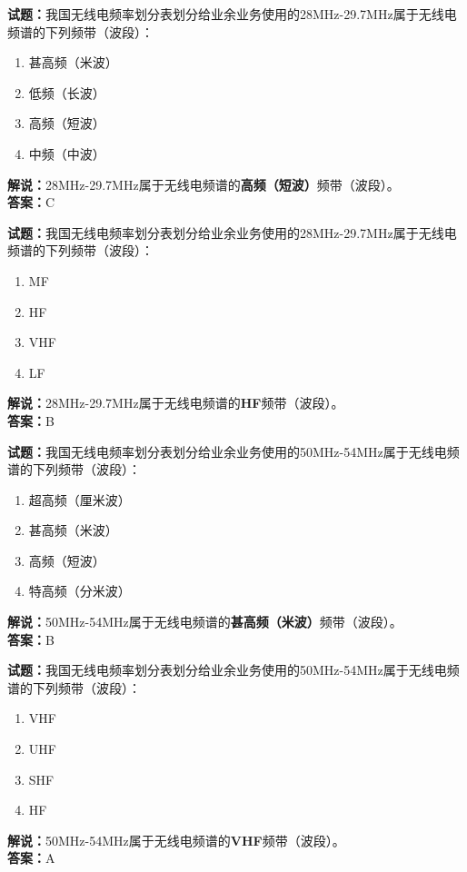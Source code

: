 \documentclass{ctexbook}
\begin{document}
\bigskip


\noindent\textbf{试题：}我国无线电频率划分表划分给业余业务使用的28\unit{\MHz}-29.7\unit{\MHz}属于无线电频谱的下列频带（波段）：
\begin{enumerate}[leftmargin=3em]
\item 甚高频（米波）
\item 低频（长波）
\item 高频（短波）
\item 中频（中波）
\end{enumerate}
\noindent\textbf{解说：}28\unit{\MHz}-29.7\unit{\MHz}属于无线电频谱的\textbf{高频（短波）}频带（波段）。\\\noindent\textbf{答案：}C




\bigskip


\noindent\textbf{试题：}我国无线电频率划分表划分给业余业务使用的28\unit{\MHz}-29.7\unit{\MHz}属于无线电频谱的下列频带（波段）：
\begin{enumerate}[leftmargin=3em]
\item MF
\item HF
\item VHF
\item LF
\end{enumerate}
\noindent\textbf{解说：}28\unit{\MHz}-29.7\unit{\MHz}属于无线电频谱的\textbf{HF}频带（波段）。\\\noindent\textbf{答案：}B



\bigskip


\noindent\textbf{试题：}我国无线电频率划分表划分给业余业务使用的50\unit{\MHz}-54\unit{\MHz}属于无线电频谱的下列频带（波段）：
\begin{enumerate}[leftmargin=3em]
\item 超高频（厘米波）
\item 甚高频（米波）
\item 高频（短波）
\item 特高频（分米波）
\end{enumerate}
\noindent\textbf{解说：}50\unit{\MHz}-54\unit{\MHz}属于无线电频谱的\textbf{甚高频（米波）}频带（波段）。\\\noindent\textbf{答案：}B



\bigskip


\noindent\textbf{试题：}我国无线电频率划分表划分给业余业务使用的50\unit{\MHz}-54\unit{\MHz}属于无线电频谱的下列频带（波段）：
\begin{enumerate}[leftmargin=3em]
\item VHF
\item UHF
\item SHF
\item HF
\end{enumerate}
\noindent\textbf{解说：}50\unit{\MHz}-54\unit{\MHz}属于无线电频谱的\textbf{VHF}频带（波段）。\\\noindent\textbf{答案：}A
\end{document}
